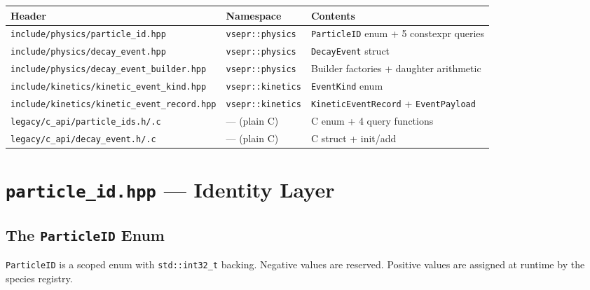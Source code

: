 \documentclass[11pt,a4paper]{article}
\begin{document}
\bigskip
\begin{center}
\begin{tabular}{lll}
\toprule
\textbf{Header} & \textbf{Namespace} & \textbf{Contents} \\
\midrule
\texttt{include/physics/particle\_id.hpp}           & \texttt{vsepr::physics} & \texttt{ParticleID} enum + 5 constexpr queries \\
\texttt{include/physics/decay\_event.hpp}            & \texttt{vsepr::physics} & \texttt{DecayEvent} struct \\
\texttt{include/physics/decay\_event\_builder.hpp}   & \texttt{vsepr::physics} & Builder factories + daughter arithmetic \\
\texttt{include/kinetics/kinetic\_event\_kind.hpp}   & \texttt{vsepr::kinetics} & \texttt{EventKind} enum \\
\texttt{include/kinetics/kinetic\_event\_record.hpp} & \texttt{vsepr::kinetics} & \texttt{KineticEventRecord} + \texttt{EventPayload} \\
\texttt{legacy/c\_api/particle\_ids.h/.c}            & --- (plain C) & C enum + 4 query functions \\
\texttt{legacy/c\_api/decay\_event.h/.c}             & --- (plain C) & C struct + init/add \\
\bottomrule
\end{tabular}
\end{center}

\section{\texttt{particle\_id.hpp} --- Identity Layer}
\label{sec:particle-id}

\subsection{The \texttt{ParticleID} Enum}

\texttt{ParticleID} is a scoped enum with \texttt{std::int32\_t} backing.
Negative values are reserved.  Positive values are assigned at runtime by
the species registry.
\end{document}
